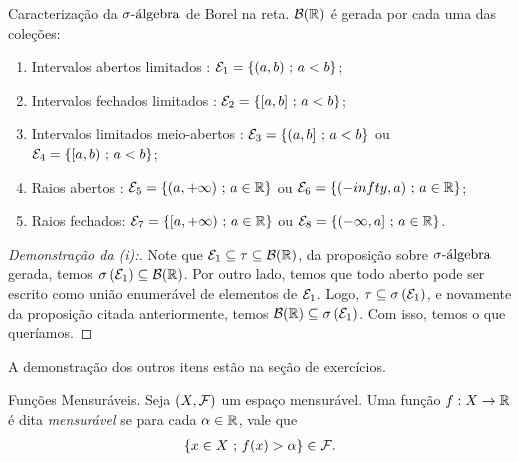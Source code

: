 \begin{prop*}{Caracterização da $\sigmaalg$ de Borel na reta.}
  $\borelR$ é gerada por cada uma das coleções:
  \begin{enumerate}[label=(\roman*)]
    \item Intervalos abertos limitados : $\mcal E_1 = \set{(a, b) \st a<b}$;
    \item Intervalos fechados limitados : $\mcal E_2 = \set{[a, b] \st a<b}$;
    \item Intervalos limitados meio-abertos : $\mcal E_3 = \set{(a, b] \st a<b}$ 
      ou $\mcal E_4 = \set{[a, b)\st a< b}$;
    \item Raios abertos : $\mcal E_5 = \set{(a, +\infty)\st a \in \bR}$
      ou $\mcal E_6 = \set{(-infty, a)\st a \in \bR}$;
    \item Raios fechados: $\mcal E_7 = \set{[a, +\infty)\st a \in \bR}$
      ou $\mcal E_8 = \set{(-\infty, a]\st a \in \bR}$.
  \end{enumerate}
\end{prop*}
\begin{proof}[Demonstração da (i):] Note que $\mcal E_1 \subseteq \tau \subseteq \borelR$,
  da proposição sobre $\sigmaalg$ gerada, temos $\siggmc {E_1} \subseteq \borelR$. Por 
  outro lado, temos que todo aberto pode ser escrito como união enumerável 
  de elementos de $\mcal E_1$. Logo, $\tau \subseteq \siggmc{E_1}$, e 
  novamente da proposição citada anteriormente, temos $\borelR \subseteq \siggmc{E_1}$. 
  Com isso, temos o que queríamos.
\end{proof}

A demonstração dos outros itens estão na seção de exercícios.

\bigline
{}
\begin{definition*}{Funções Mensuráveis.}
  Seja $(X, \mcal F)$ um espaço mensurável. Uma função $f: X \rightarrow \bR$ é 
  dita \textit{mensurável} se para cada $\alpha \in \bR$, vale que 
  \begin{align*}
    \set{x \in X\st f(x)> \alpha} \in \mcal F.
  \end{align*}
\end{definition*}


